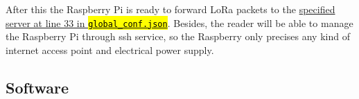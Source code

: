 \documentclass[11pt,a4paper,dvipsnames,twoside]{article}
\newcommand{\cmd}[1] {\hl{\texttt{#1}}}
\begin{document}
After this the Raspberry Pi is ready to forward LoRa packets to the \href{https://github.com/dragino/dual_chan_pkt_fwd/blob/master/global_conf.json#L33}{specified server at line 33 in \cmd{global\_conf.json}}. Besides, the reader will be able to manage the Raspberry Pi through ssh service, so the Raspberry only precises any kind of internet access point and electrical power supply.












\subsection{Software}






















{}
\printbibliography
\end{document}
